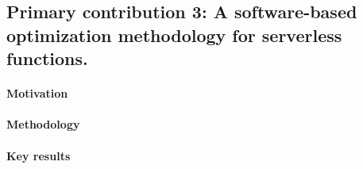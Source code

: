 \documentclass[../main.tex]{subfiles}
\begin{document}
\begin{refsection}
\subsection{Primary contribution 3: A software-based optimization methodology for serverless functions.}
\paragraph{Motivation}

\paragraph{Methodology}

\paragraph{Key results}



\ifx\chapincluded\undefined
  \printbibliography
  \end{refsection}
 \fi
\end{document}
